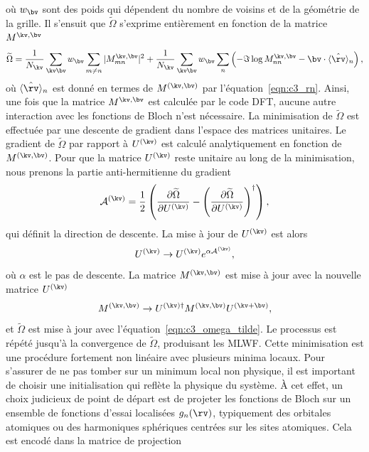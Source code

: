 où $w_\bv$ sont des poids qui dépendent du nombre de voisins et de la géométrie de la grille. Il s'ensuit que $\widetilde{\Omega}$ s'exprime entièrement en fonction de la matrice $M^{\kv,\bv}$ 
\begin{equation}
    \widetilde{\Omega}=\frac{1}{N_\kv}\sum_{\kv\bv}w_\bv\sum_{m\neq n}|M_{mn}^{\kv,\bv}|^2+\frac{1}{N_\kv}\sum_{\kv\bv}w_\bv\sum_n\left(-\Im\log M_{nn}^{\kv,\bv}-\bv\cdot\langle \hat{\rv}\rangle_n\right),
    \label{eqn:c3_omega_tilde}
\end{equation}
où $\langle\hat{\rv}\rangle_n$ est donné en termes de $M^{(\kv,\bv)}$ par l'équation~\eqref{eqn:c3_rn}. Ainsi, une fois que la matrice $M^{\kv,\bv}$ est calculée par le code DFT, aucune autre interaction avec les fonctions de Bloch n'est nécessaire. La minimisation de $\widetilde{\Omega}$ est effectuée par une descente de gradient dans l'espace des matrices unitaires. Le gradient de $\widetilde{\Omega}$ par rapport à $U^{(\kv)}$ est calculé analytiquement en fonction de $M^{(\kv,\bv)}$. Pour que la matrice $U^{(\kv)}$ reste unitaire au long de la minimisation, nous prenons la partie anti-hermitienne du gradient
\begin{equation}
    \mathcal{A}^{(\kv)}=\frac{1}{2}\left(\frac{\partial \widetilde{\Omega}}{\partial U^{(\kv)}}-\left(\frac{\partial \widetilde{\Omega}}{\partial U^{(\kv)}}\right)^\dag\right),
\end{equation}
qui définit la direction de descente. La mise à jour de $U^{(\kv)}$ est alors
\begin{equation}
   U^{(\kv)}\rightarrow U^{(\kv)}e^{\alpha \mathcal{A}^{(\kv)}},
\end{equation}
où $\alpha$ est le pas de descente. La matrice $M^{(\kv,\bv)}$ est mise à jour avec la nouvelle matrice $U^{(\kv)}$
\begin{equation}
    M^{(\kv,\bv)}\rightarrow U^{(\kv)\dag} M^{(\kv,\bv)}U^{(\kv+\bv)},
\end{equation}
et $\widetilde{\Omega}$ est mise à jour avec l'équation~\eqref{eqn:c3_omega_tilde}. Le processus est répété jusqu'à la convergence de $\widetilde{\Omega}$, produisant les MLWF. Cette minimisation est une procédure fortement non linéaire avec plusieurs minima locaux. Pour s'assurer de ne pas tomber sur un minimum local non physique, il est important de choisir une initialisation qui reflète la physique du système. À cet effet, un choix judicieux de point de départ est de projeter les fonctions de Bloch sur un ensemble de fonctions d'essai localisées $g_n(\rv)$, typiquement des orbitales atomiques ou des harmoniques sphériques centrées sur les sites atomiques. Cela est encodé dans la matrice de projection
